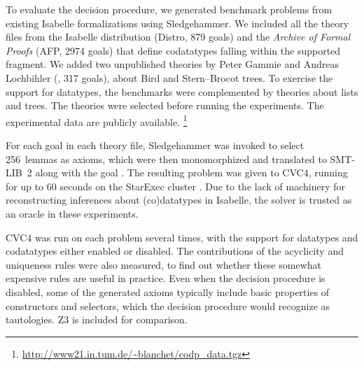 To evaluate the decision procedure, we generated benchmark problems from existing
Isabelle formalizations using Sledgehammer.
We
included all the theory files from the Isabelle distribution (Distro, 879 goals)
and the \emph{Archive of Formal Proofs} (AFP, 2974 goals) \cite{klein-et-al-afp}
that define codatatypes falling within the supported fragment. We added
two unpublished theories by Peter Gammie and Andreas Lochbihler (\gandl, 317
goals), about Bird and Stern--Brocot trees. To exercise the support
for datatypes, the benchmarks were complemented by theories about lists
and trees. The theories were selected before running the
experiments. The experimental data are publicly available.%
\footnote{\url{http://www21.in.tum.de/~blanchet/codp_data.tgz}}


For each goal in each theory file, Sledgehammer was invoked to select
256~lemmas as axioms, which were then monomorphized and translated to SMT-LIB~2
along with the goal \cite{blanchette-et-al-2013-smt}. The resulting problem was
given to CVC4, running for up to 60 seconds on the StarExec cluster
\cite{stump-et-al-2014-starexec}.
Due to the lack of machinery for reconstructing inferences about (co)datatypes
in Isabelle, the solver is trusted as an oracle in these experiments.

CVC4 was run on each problem several times, with the support for datatypes and
codatatypes either enabled or disabled. The contributions of the acyclicity and
uniqueness rules were also measured, to find out whether these somewhat
expensive rules are useful in practice. Even when the decision procedure is
disabled, some of the generated axioms typically include basic properties of
constructors and selectors, which the decision procedure would recognize as
tautologies. Z3 is included for comparison. %


